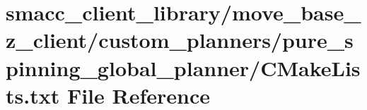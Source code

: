 \hypertarget{client__library_2move__base__z__client_2custom__planners_2pure__spinning__global__planner_2CMakeLists_8txt}{}\section{smacc\+\_\+client\+\_\+library/move\+\_\+base\+\_\+z\+\_\+client/custom\+\_\+planners/pure\+\_\+spinning\+\_\+global\+\_\+planner/\+C\+Make\+Lists.txt File Reference}
\label{client__library_2move__base__z__client_2custom__planners_2pure__spinning__global__planner_2CMakeLists_8txt}
